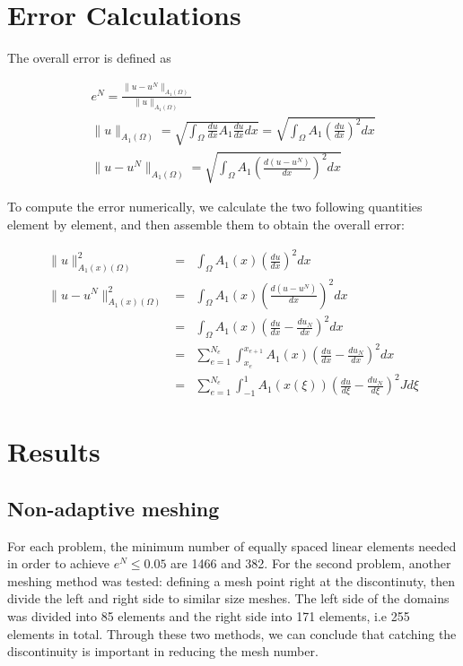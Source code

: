 \documentclass[a4paper, 12pt]{article} %
\begin{document}
\section{Error Calculations}
The overall error is defined as 

\begin{eqnarray}
e^N = \frac{\| u -u^N \| _{A_1(\Omega)}} {\| u \| _{A_1 (\Omega)}} \nonumber\\
\| u \| _{A_1 (\Omega)} = \sqrt{\int_{\Omega} \frac{du}{dx} A_1 \frac{du}{dx} dx} = \sqrt{\int_{\Omega} A_1(\frac{du}{dx})^2 dx}\nonumber\\
\| u -u^N \| _{A_1(\Omega)} = \sqrt{\int_{\Omega} A_1 (\frac{d(u-u^N)}{dx})^2 dx}
\end{eqnarray}

To compute the error numerically, we calculate the two following quantities element by element, and then assemble them to obtain the overall error:

\begin{eqnarray}
\| u \| _{A_1(x) (\Omega)}^2 &=&\int_{\Omega} A_1(x)(\frac{du}{dx})^2 dx\nonumber\\
\| u -u^N \| _{A_1(x)(\Omega)} ^2 &=& \int_{\Omega} A_1(x) (\frac{d(u-u^N)}{dx})^2 dx\nonumber\\
&=&  \int_{\Omega} A_1(x)(\frac{du}{dx} - \frac{du_N}{dx})^2 dx\nonumber\\
&=&  \sum_{e=1}^{N_e} \int_{x_e}^{x_{e+1}} A_1(x)(\frac{du}{dx} - \frac{du_N}{dx})^2 dx \nonumber\\
&=&  \sum_{e=1}^{N_e} \int_{-1}^{1} A_1(x(\xi)) (\frac{du}{d\xi} - \frac{du_N}{d\xi})^2 J d\xi
\end{eqnarray}


\section{Results}
\subsection{Non-adaptive meshing}
For each problem, the minimum number of equally spaced linear elements needed in order to achieve $e^N \leq 0.05$ are 1466 and 382. For the second problem, another meshing method was tested: defining a mesh point right at the discontinuty, then divide the left and right side to similar size meshes. The left side of the domains was divided into 85 elements and the right side into 171 elements, i.e 255 elements in total. Through these two methods, we can conclude that catching the discontinuity is important in reducing the mesh number. 
\end{document}
